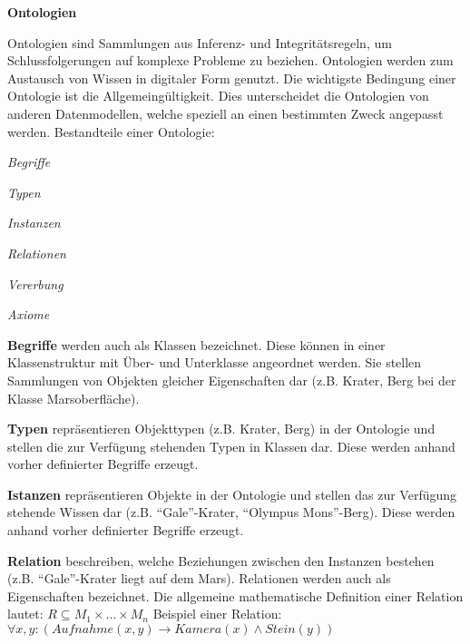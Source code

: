 \textbf{Ontologien}

Ontologien sind Sammlungen aus Inferenz- und Integrit{\"a}tsregeln, um
Schlussfolgerungen auf komplexe Probleme zu beziehen. Ontologien werden zum
Austausch von Wissen in digitaler Form genutzt. Die wichtigste Bedingung einer
Ontologie ist die Allgemeing{\"u}ltigkeit. Dies unterscheidet die Ontologien von
anderen Datenmodellen, welche speziell an einen bestimmten Zweck angepasst
werden.
Bestandteile einer Ontologie:

 \begin{compactenum}[I]
   \item \textit{Begriffe}
   \item \textit{Typen}
   \item \textit{Instanzen}
   \item \textit{Relationen}
   \item \textit{Vererbung}
   \item \textit{Axiome}
 \end{compactenum}
   
 \textbf{Begriffe} werden auch als Klassen bezeichnet. Diese
 k{\"o}nnen in einer Klassenstruktur mit {\"U}ber- und Unterklasse angeordnet
 werden. Sie stellen Sammlungen von Objekten gleicher Eigenschaften dar
 (z.B. Krater, Berg bei der Klasse Marsoberfl{\"a}che).
 
 \textbf{Typen} repr{\"a}sentieren Objekttypen (z.B. Krater, Berg) in
 der Ontologie und stellen die zur Verf{\"u}gung stehenden Typen in Klassen dar.
 Diese werden anhand vorher definierter Begriffe erzeugt.
 
 \textbf{Istanzen} repr{\"a}sentieren Objekte in
 der Ontologie und stellen das zur Verf{\"u}gung stehende Wissen dar
 (z.B. "`Gale"'-Krater, "`Olympus Mons"'-Berg). Diese werden anhand vorher
 definierter Begriffe erzeugt.
 
 \textbf{Relation} beschreiben, welche Beziehungen zwischen den Instanzen
 bestehen (z.B. "`Gale"'-Krater liegt auf dem Mars). Relationen werden auch als
 Eigenschaften bezeichnet.
 \newline
 Die allgemeine mathematische Definition einer Relation lautet:
 \newline    \newline
 $R \subseteq M_1 \times \ldots \times M_n$
 \newline    \newline
 Beispiel einer Relation:
 \newline    \newline
 $\forall x,y : (Aufnahme(x,y) \rightarrow Kamera(x) \wedge Stein(y))$
 
